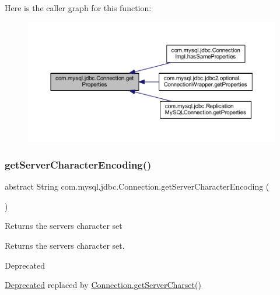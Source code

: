 Here is the caller graph for this function\+:\nopagebreak
\begin{figure}[H]
\begin{center}
\leavevmode
\includegraphics[width=350pt]{interfacecom_1_1mysql_1_1jdbc_1_1_connection_ad594d416be84166aff54270aa66b3d71_icgraph}
\end{center}
\end{figure}
\mbox{\label{interfacecom_1_1mysql_1_1jdbc_1_1_connection_ab6e0170645e189b8622642705f7cc3a4}} 
\subsubsection{\texorpdfstring{get\+Server\+Character\+Encoding()}{getServerCharacterEncoding()}}
{\footnotesize\ttfamily abstract String com.\+mysql.\+jdbc.\+Connection.\+get\+Server\+Character\+Encoding (\begin{DoxyParamCaption}{ }\end{DoxyParamCaption})\hspace{0.3cm}{\ttfamily [abstract]}}

Returns the server\textquotesingle{}s character set

\begin{DoxyReturn}{Returns}
the server\textquotesingle{}s character set. 
\end{DoxyReturn}
\begin{DoxyRefDesc}{Deprecated}
\item[\mbox{\hyperlink{deprecated__deprecated000006}{Deprecated}}]replaced by {\ttfamily \mbox{\hyperlink{interfacecom_1_1mysql_1_1jdbc_1_1_connection_a1831e47e0daa7d5a4b362219105a85ec}{Connection.\+get\+Server\+Charset()}}} \end{DoxyRefDesc}


